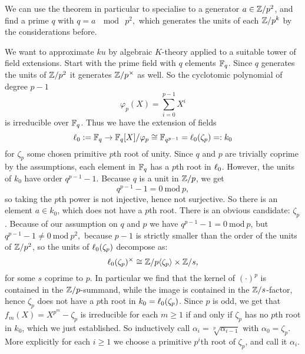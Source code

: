 We can use the theorem in particular to specialise to a 
generator $a\in\mathbb{Z}/p^2$, and find a prime $q$ with $q=a~\mod ~p^2,$ 
which generates the units of each $\mathbb{Z}/p^k$ by the considerations 
before. 

{}

We want to approximate $ku$ by algebraic $K$-theory applied to 
a suitable tower of field extensions.
Start with the prime field with $q$ elements $\mathbb{F}_q$. Since $q$ 
generates the units of $\mathbb{Z}/p^2$ it generates $\mathbb{Z}/p^\times$
as well. So the cyclotomic polynomial of degree $p-1$ \[\varphi_{p}(X)
=\sum_{i=0}^{p-1}X^i\] is irreducible over $\mathbb{F}_q$. Thus we have the 
extension of fields \[\ell_0:=\mathbb{F}_q\rightarrow \mathbb{F}_q[X]/\varphi_p\cong 
\mathbb{F}_{q^{p-1}}=\ell_0(\zeta_{p})=:k_0\] for $\zeta_p$ some chosen primitive 
$p$th root of unity.
Since $q$ and $p$ are trivially coprime by the assumptions, each 
element in $\mathbb{F}_q$ has a $p$th root in $\ell_0$. However, the units of
$k_0$ have order $q^{p-1}-1$. Because $q$ is a unit in $\mathbb{Z}/p$, we get
\[q^{p-1}-1=0\mathrm{~mod~} p,\]
so taking the $p$th power is not injective, hence not surjective.
So there is an element $a\in k_0$, which does not have a $p$th root.
There is an obvious candidate: $\zeta_p$. Because of our assumption on
$q$ and $p$ we have $q^{p-1}-1=0\mathrm{~mod~} p$, but 
$q^{p-1}-1\neq0\mathrm{~mod~} p^2,$ because $p-1$ is strictly smaller
than the order of the units of $\mathbb{Z}/p^2$, so the units of $\ell_0(\zeta_p)$ 
decompose as:\[\ell_0(\zeta_p)^\times \cong
\mathbb{Z}/p\langle\zeta_p\rangle\times \mathbb{Z}/s,\] for some $s$ coprime to $p$. 
In particular we find that the kernel of $(\cdot)^p$ is contained 
in the $\mathbb{Z}/p$-summand, while the image is contained in the $\mathbb{Z}/s$-factor,
hence $\zeta_p$ does not have a $p$th root in $k_0=\ell_0(\zeta_p)$.
Since $p$ is odd, we get that $f_m(X)=X^{p^m}-\zeta_p$ is irreducible
for each $m\geq 1$ if and only if $\zeta_p$ has no $p$th root in $k_0$,
which we just established. So inductively call $\alpha_i = 
\sqrt[p]{\alpha_{i-1}}$ with $\alpha_0 = \zeta_p$. More explicitly
for each $i\geq 1$ we choose a primitive $p^i$th root of $\zeta_p$, and
call it $\alpha_i$.

